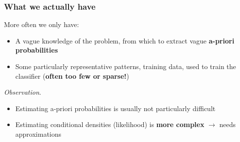 \documentclass[a4paper]{article}
\theoremstyle{definition}
\begin{document}
\subsubsection{What we actually have}
More often we only have:
\begin{itemize}
    \item A vague knowledge of the problem, from which to extract vague \textbf{a-priori probabilities}
    \item Some particularly representative patterns, training data, used to train the classifier (\textbf{often too few or sparse!})
\end{itemize}
\textit{Observation}.
\begin{itemize}
    \item Estimating a-priori probabilities is usually not particularly difficult 
    \item Estimating conditional densities (likelihood) is \textbf{more complex} \( \rightarrow \) needs approximations
\end{itemize}
\end{document}
